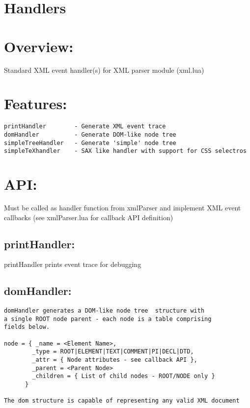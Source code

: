 \documentclass{ltxdoc}
\begin{document}
\section{Handlers}

\section{Overview:}

Standard XML event handler(s) for XML parser module (xml.lua)

\section{Features:}

\begin{verbatim}
printHandler        - Generate XML event trace
domHandler          - Generate DOM-like node tree
simpleTreeHandler   - Generate 'simple' node tree
simpleTeXhandler    - SAX like handler with support for CSS selectros
\end{verbatim}
\section{API:}

Must be called as handler function from xmlParser and implement XML
event callbacks (see xmlParser.lua for callback API definition)

\subsection{printHandler:}

printHandler prints event trace for debugging

\subsection{domHandler:}

\begin{verbatim}
domHandler generates a DOM-like node tree  structure with 
a single ROOT node parent - each node is a table comprising 
fields below.

node = { _name = <Element Name>,
        _type = ROOT|ELEMENT|TEXT|COMMENT|PI|DECL|DTD,
        _attr = { Node attributes - see callback API },
        _parent = <Parent Node>
        _children = { List of child nodes - ROOT/NODE only }
      }

The dom structure is capable of representing any valid XML document
\end{verbatim}
\end{document}
